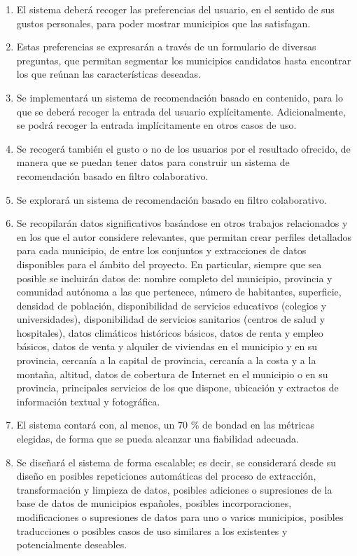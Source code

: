 \begin{enumerate}
    \item El sistema deberá recoger las preferencias del usuario, en el sentido de sus gustos personales, para poder mostrar municipios que las satisfagan.
    \item Estas preferencias se expresarán a través de un formulario de diversas preguntas, que permitan segmentar los municipios candidatos hasta encontrar los que reúnan las características deseadas.
    \item Se implementará un sistema de recomendación basado en contenido, para lo que se deberá recoger la entrada del usuario explícitamente. Adicionalmente, se podrá recoger la entrada implícitamente en otros casos de uso.
    \item Se recogerá también el gusto o no de los usuarios por el resultado ofrecido, de manera que se puedan tener datos para construir un sistema de recomendación basado en filtro colaborativo.
    \item Se explorará un sistema de recomendación basado en filtro colaborativo.
    \item Se recopilarán datos significativos basándose en otros trabajos relacionados y en los que el autor considere relevantes, que permitan crear perfiles detallados para cada municipio, de entre los conjuntos y extracciones de datos disponibles para el ámbito del proyecto. En particular, siempre que sea posible se incluirán datos de: nombre completo del municipio, provincia y comunidad autónoma a las que pertenece, número de habitantes, superficie, densidad de población, disponibilidad de servicios educativos (colegios y universidades), disponibilidad de servicios sanitarios (centros de salud y hospitales), datos climáticos históricos básicos, datos de renta y empleo básicos, datos de venta y alquiler de viviendas en el municipio y en su provincia, cercanía a la capital de provincia, cercanía a la costa y a la montaña, altitud, datos de cobertura de Internet en el municipio o en su provincia, principales servicios de los que dispone, ubicación y extractos de información textual y fotográfica.
    \item El sistema contará con, al menos, un 70 \% de bondad en las métricas elegidas, de forma que se pueda alcanzar una fiabilidad adecuada.
    \item Se diseñará el sistema de forma escalable; es decir, se considerará desde su diseño en posibles repeticiones automáticas del proceso de extracción, transformación y limpieza de datos, posibles adiciones o supresiones de la base de datos de municipios españoles, posibles incorporaciones, modificaciones o supresiones de datos para uno o varios municipios, posibles traducciones o posibles casos de uso similares a los existentes y potencialmente deseables.

\end{enumerate}
